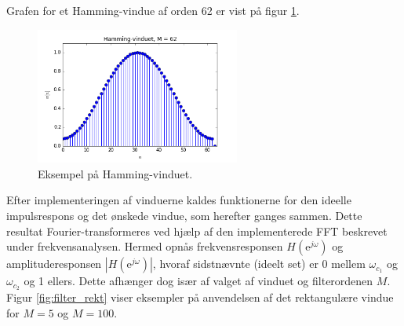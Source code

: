 Grafen for et Hamming-vindue af orden 62 er vist på figur \ref{fig:Hamming}.
\begin{figure}[H]
    \centering
    \includegraphics[width = 0.6\textwidth]{figures/Filter/Hamming_62.PNG}
    \caption{Eksempel på Hamming-vinduet.}
    \label{fig:Hamming}
\end{figure}

Efter implementeringen af vinduerne kaldes funktionerne for den ideelle impulsrespons og det ønskede vindue, som herefter ganges sammen. Dette resultat Fourier-transformeres ved hjælp af den implementerede FFT beskrevet under frekvensanalysen. Hermed opnås frekvensresponsen $H(\text{e}^{j\omega})$ og amplituderesponsen $|H(\text{e}^{j\omega})|$, hvoraf sidstnævnte (ideelt set) er 0 mellem $\omega_{c_1}$ og $\omega_{c_2}$ og 1 ellers. Dette afhænger dog især af valget af vinduet og filterordenen $M$. Figur \ref{fig:filter_rekt} viser eksempler på anvendelsen af det rektangulære vindue for $M = 5$ og $M = 100$.

